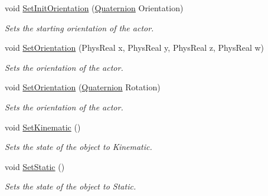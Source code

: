\begin{DoxyCompactItemize}
void \hyperlink{classActorBase_a968b3c8b29aac97b5240cf933783865b}{SetInitOrientation} (\hyperlink{classphys_1_1Quaternion}{Quaternion} Orientation)
\begin{DoxyCompactList}\small\item\em Sets the starting orientation of the actor. \item\end{DoxyCompactList}\item 
void \hyperlink{classActorBase_a9777506815a9840552b30c65d5d70f8d}{SetOrientation} (PhysReal x, PhysReal y, PhysReal z, PhysReal w)
\begin{DoxyCompactList}\small\item\em Sets the orientation of the actor. \item\end{DoxyCompactList}\item 
void \hyperlink{classActorBase_a66429021cfc19b32cd0f645955e20584}{SetOrientation} (\hyperlink{classphys_1_1Quaternion}{Quaternion} Rotation)
\begin{DoxyCompactList}\small\item\em Sets the orientation of the actor. \item\end{DoxyCompactList}\item 
void \hyperlink{classActorBase_a2d5f990e8c6925b7e44e9ec85f379e6a}{SetKinematic} ()
\begin{DoxyCompactList}\small\item\em Sets the state of the object to Kinematic. \item\end{DoxyCompactList}\item 
void \hyperlink{classActorBase_a97f55e5fff5d69483ebb0b9042a50bb0}{SetStatic} ()
\begin{DoxyCompactList}\small\item\em Sets the state of the object to Static. \item\end{DoxyCompactList}\end{DoxyCompactItemize}
